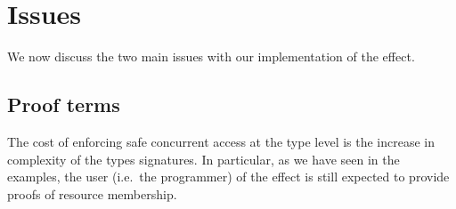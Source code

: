 \section{Issues}

We now discuss the two main issues with our implementation of the
 effect.

\subsection{Proof terms}

The cost of enforcing safe concurrent access at the type level is the increase
in complexity of the types signatures. In particular, as we have seen in the
examples, the user (i.e.~the programmer) of the effect is still expected to
provide proofs of resource membership.

